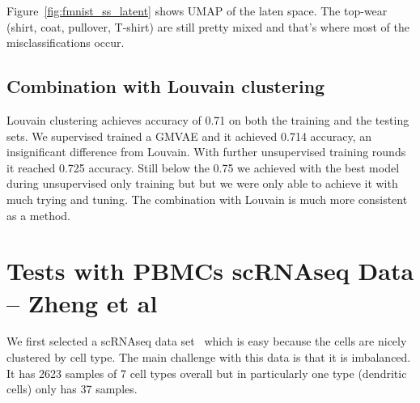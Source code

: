 \documentclass[11pt, a4paper]{report}
\theoremstyle{plain}
\theoremstyle{definition}
\theoremstyle{remark}
\begin{document}
Figure~\ref{fig:fmnist_ss_latent} shows UMAP of the laten space.
The top-wear (shirt, coat, pullover, T-shirt) are still pretty mixed and that's
where most of the misclassifications occur.


\section{Combination with Louvain clustering}

Louvain clustering achieves accuracy of 0.71 on both the training and the
testing sets.
We supervised trained a GMVAE and it achieved 0.714 accuracy, an insignificant
difference from Louvain. With further unsupervised training rounds it reached 
0.725 accuracy. Still below the 0.75 we achieved with the best model during 
unsupervised only training but but we were only able to
achieve it with much trying and tuning.
The combination with Louvain is much more consistent as a method.


\chapter{Tests with PBMCs scRNAseq Data -- Zheng et al}

We first selected a scRNAseq data set~\cite{zheng2017massively} which is easy
because the cells are nicely clustered by cell type.
The main challenge with this data is that it is imbalanced. It has 2623 samples
of 7 cell types overall but in particularly one type (dendritic cells) only has 37 samples.
\end{document}
